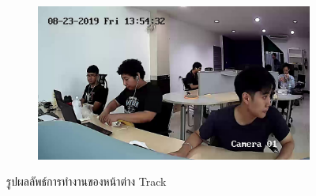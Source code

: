 \begin{figure}[!ht]
\begin{subfigure}[b]{0.55\linewidth}
    \end{subfigure}
    \begin{subfigure}[b]{0.55\linewidth}
      \includegraphics[width=\linewidth]{appendix/images/17.jpg}
    \end{subfigure}
    \caption{รูปผลลัพธ์การทำงานของหน้าต่าง Track}
    \label{fig:result_track}
  \end{figure}
